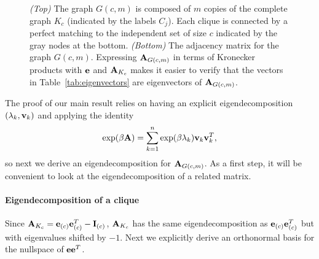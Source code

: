 \begin{figure}
      \centering
      \resizebox{0.7\linewidth}{!}{}%
      \vspace{10pt}
    \caption{\label{fig:generalized-kral}
        \emph{(Top)} The graph $G(c,m)$ is composed of $m$ copies of the complete graph $K_c$ (indicated by the labels $C_j$). Each clique is connected by a perfect matching to the independent set of size $c$ indicated by the gray nodes at the bottom.
        \emph{(Bottom)} The adjacency matrix for the graph $G(c,m)$. Expressing $\textbf{A}_{G(c,m)}$ in terms of Kronecker products with $\textbf{e}$ and $\textbf{A}_{K_c}$ makes it easier to verify that the vectors in Table~\ref{tab:eigenvectors} are eigenvectors of $\textbf{A}_{G(c,m)}$.
    }
\end{figure}

The proof of our main result relies on having an explicit eigendecomposition $(\lambda_k, \textbf{v}_k)$ and applying the identity
\[
    \exp(\beta \textbf{A}) = \sum_{k=1}^n \exp( \beta \lambda_k ) \textbf{v}_k \textbf{v}_k^T,
\]
so next we derive an eigendecomposition for $\textbf{A}_{G(c,m)}$.
As a first step, it will be convenient to look at the eigendecomposition of a related matrix.

\paragraph{Eigendecomposition of a clique}
Since $\textbf{A}_{K_c} = \textbf{e}_{(c)}\textbf{e}_{(c)}^T - \textbf{I}_{(c)}$,
$\textbf{A}_{K_c}$ has the same eigendecomposition as $\textbf{e}_{(c)}\textbf{e}_{(c)}^T$ but with eigenvalues shifted by $-1$.
Next we explicitly derive an orthonormal basis for the nullspace of $\textbf{e}\textbf{e}^T$.

